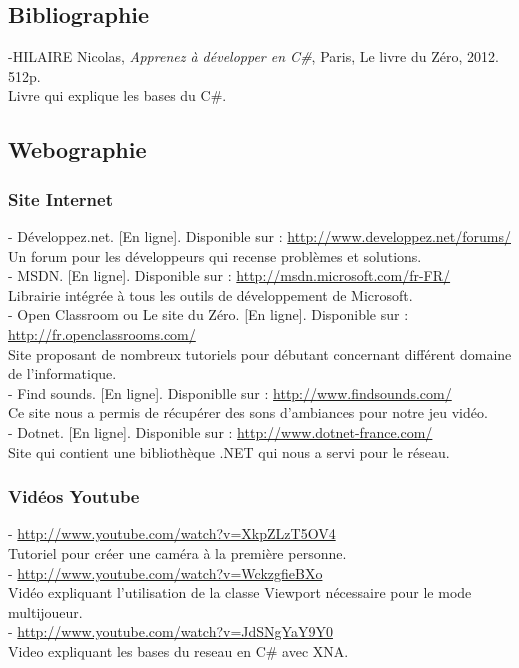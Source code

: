\documentclass[12pt]{article}
\begin{document}
\subsection{Bibliographie}
\noindent
-HILAIRE Nicolas, \textit{Apprenez à développer en C\#}, Paris, Le livre du Zéro, 2012. 512p. \\
Livre qui explique les bases du C\#. 

\subsection{Webographie}
\subsubsection{Site Internet}
\noindent
- Développez.net. [En ligne]. Disponible sur : \underline{http://www.developpez.net/forums/} \\
Un forum pour les développeurs qui recense problèmes et solutions. \\
- MSDN. [En ligne]. Disponible sur :  \underline{http://msdn.microsoft.com/fr-FR/} \\
Librairie intégrée à tous les outils de développement de Microsoft. \\
- Open Classroom ou Le site du Zéro. [En ligne]. Disponible sur : \underline{http://fr.openclassrooms.com/} \\
Site proposant de nombreux tutoriels pour débutant concernant différent domaine de l'informatique. \\
- Find sounds. [En ligne]. Disponiblle sur :  \underline{http://www.findsounds.com/} \\
Ce site nous a permis de récupérer des sons d'ambiances pour notre jeu vidéo.\\
- Dotnet. [En ligne]. Disponible sur :  \underline{http://www.dotnet-france.com/} \\
Site qui contient une bibliothèque .NET qui nous a servi pour le réseau. 
\newpage
\subsubsection{Vidéos Youtube}
\noindent
-  \underline{http://www.youtube.com/watch?v=XkpZLzT5OV4} \\
Tutoriel pour créer une caméra à la première personne. \\
-  \underline{http://www.youtube.com/watch?v=WckzgfieBXo} \\
Vidéo expliquant l'utilisation de la classe Viewport nécessaire pour le mode multijoueur. \\
-  \underline{http://www.youtube.com/watch?v=JdSNgYaY9Y0} \\
Video expliquant les bases du reseau en C\# avec XNA. 

\newpage
{}

\newpage
\thispagestyle{empty}
\pagestyle{fancyplain} \chead{} 
\listoffigures
{}
\end{document}
